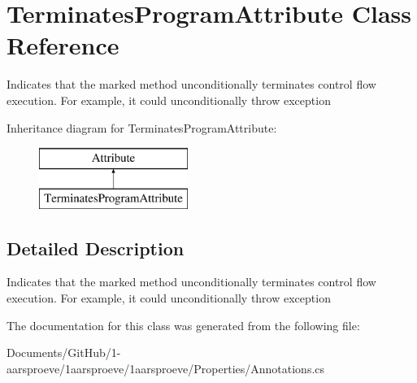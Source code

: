 \hypertarget{class_terminates_program_attribute}{}\section{Terminates\+Program\+Attribute Class Reference}
\label{class_terminates_program_attribute}


Indicates that the marked method unconditionally terminates control flow execution. For example, it could unconditionally throw exception  


Inheritance diagram for Terminates\+Program\+Attribute\+:\begin{figure}[H]
\begin{center}
\leavevmode
\includegraphics[height=2.000000cm]{class_terminates_program_attribute}
\end{center}
\end{figure}


\subsection{Detailed Description}
Indicates that the marked method unconditionally terminates control flow execution. For example, it could unconditionally throw exception 



The documentation for this class was generated from the following file\+:\begin{DoxyCompactItemize}
\item 
Documents/\+Git\+Hub/1-\/aarsproeve/1aarsproeve/1aarsproeve/\+Properties/Annotations.\+cs\end{DoxyCompactItemize}

